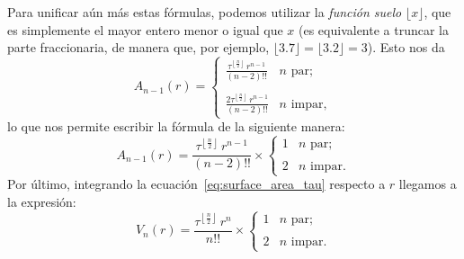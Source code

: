 Para unificar aún más estas fórmulas, podemos utilizar la \emph{función suelo} $\lfloor x \rfloor$, que es simplemente el mayor entero menor o igual que $x$ (es equivalente a truncar la parte fraccionaria, de manera que, por ejemplo, $\lfloor 3.7 \rfloor = \lfloor 3.2 \rfloor = 3$). Esto nos da
\[ A_{n-1}(r) = \begin{cases}
 \displaystyle \frac{\tau^{\left\lfloor \frac{n}{2} \right\rfloor}\,r^{n-1}}{(n-2)!!} & n \text{ par}; \\ \\
 \displaystyle \frac{2\tau^{\left\lfloor \frac{n}{2} \right\rfloor}\,r^{n-1}}{(n-2)!!} & n \text{ impar},
 \end{cases} \]
lo que nos permite escribir la fórmula de la siguiente manera:
\begin{equation}
\label{eq:surface_area_tau}
A_{n-1}(r) = \frac{\tau^{\left\lfloor \frac{n}{2} \right\rfloor}\,r^{n-1}}{(n-2)!!}\times \begin{cases}
1 & n \text{ par}; \\ \\
2 & n \text{ impar}.
\end{cases}
\end{equation}
Por último, integrando la ecuación~\eqref{eq:surface_area_tau} respecto a $r$ llegamos a la expresión:
\begin{equation}
\label{eq:volume_tau}
V_n(r) = \frac{\tau^{\left\lfloor \frac{n}{2} \right\rfloor}\,r^n}{n!!}\times \begin{cases}
1 & n \text{ par}; \\ \\
2 & n \text{ impar}.
\end{cases}
\end{equation}
